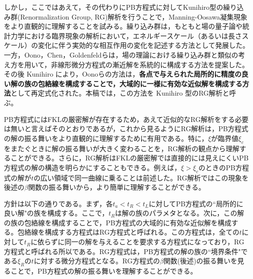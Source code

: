 \documentclass[11pt,a4paper]{ltjsarticle}
\theoremstyle{definition}
\theoremstyle{remark}
\begin{document}
しかし，ここではあえて，その代わりにPB方程式に対してKunihiro型の繰り込み群(Renormalization Group, RG)解析を行うことで，Manning-Oosawa凝集現象をより直観的に理解することを試みる。繰り込み群は，もともと場の量子論や統計力学における臨界現象の解析において，エネルギースケール（あるいは長さスケール）の変化に伴う実効的な相互作用の変化を記述する方法として発展した。一方，Oono，Chen，Goldenfeldらは，場の理論における繰り込み群と類似の考え方を用いて，非線形微分方程式の漸近解を系統的に構成する方法を提案した\cite{ChenGoldenfeldOono1994,GoldenfeldOono1996}。その後 Kunihiro により，Oonoらの方法は，\textbf{各点で与えられた局所的に精度の良い解の族の包絡線を構成することで，大域的に一様に有効な近似解を構成する方法}として再定式化された\cite{Kunihiro1995,Kunihiro1997}。本稿では，この方法を Kunihiro 型のRG解析と呼ぶ。

PB方程式にはFKLの厳密解が存在するため，あえて近似的なRG解析をする必要は無いと言えばそのとおりであるが，これから見るようにRG解析は，PB方程式の解の振る舞いをより直観的に理解するために有用である。特に，$\xi$が臨界値$\xi_c$をまたぐときに解の振る舞いが大きく変わることを，RG解析の観点から理解することができる。さらに，RG解析はFKLの厳密解では直接的には見えにくいPB方程式の解の構造を明らかにすることもできる。例えば，$\xi>\xi_c$のときのPB方程式の解が$t$の広い領域で同一曲線に乗ることは前述した。RG解析ではこの現象を後述の$\beta$関数の振る舞いから，より簡単に理解することができる。

方針は以下の通りである。まず，各$t_a<t_R<t_L$に対してPB方程式の``局所的に良い解"の族を構成する。ここで，$t_R$は解の族のパラメタとなる。次に，この解の族の包絡線を構成することで，PB方程式の大域的に有効な近似解を構成する。包絡線を構成する方程式はRG方程式と呼ばれる。この方程式は，全ての$t$に対して$t_R$に依らずに同一の解を与えることを要求する方程式になっており，RG方程式と呼ばれる所以である。RG方程式は，PB方程式の解の族の``境界条件"である$\xi_R$の$t$に対する微分方程式となる。RG方程式の$\beta$関数(後述)の振る舞いを見ることで，PB方程式の解の振る舞いを理解することができる。
\end{document}
